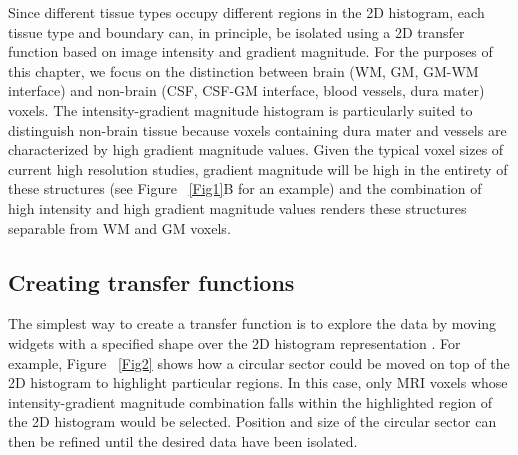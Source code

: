 Since different tissue types occupy different regions in the 2D histogram, each tissue type and boundary can, in principle, be isolated using a 2D transfer function based on image intensity and gradient magnitude. For the purposes of this chapter, we focus on the distinction between brain (WM, GM, GM-WM interface) and non-brain (CSF, CSF-GM interface, blood vessels, dura mater) voxels. The intensity-gradient magnitude histogram is particularly suited to distinguish non-brain tissue because voxels containing dura mater and vessels are characterized by high gradient magnitude values. Given the typical voxel sizes of current high resolution studies, gradient magnitude will be high in the entirety of these structures (see Figure ~\ref{Fig1}B for an example) and the combination of high intensity and high gradient magnitude values renders these structures separable from WM and GM voxels.

\subsection{Creating transfer functions}
The simplest way to create a transfer function is to explore the data by moving widgets with a specified shape over the 2D histogram representation \parencite{Kniss2005}. For example, Figure ~\ref{Fig2} shows how a circular sector could be moved on top of the 2D histogram to highlight particular regions. In this case, only MRI voxels whose intensity-gradient magnitude combination falls within the highlighted region of the 2D histogram would be selected. Position and size of the circular sector can then be refined until the desired data have been isolated.

